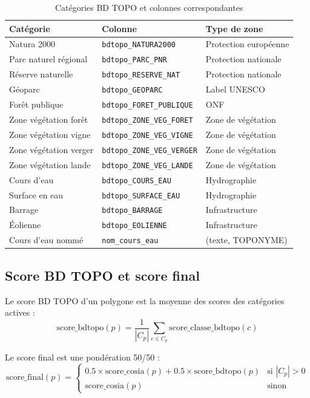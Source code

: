 \documentclass[11pt,a4paper]{report}
\newcommand{\code}[1]{\texttt{\small #1}}
\begin{document}
\begin{table}[H]
\centering
\begin{tabular}{lll}
\toprule
\rowcolor{seuilgris!75}
\textbf{Catégorie} & \textbf{Colonne} & \textbf{Type de zone} \\
\midrule
Natura 2000 & \code{bdtopo\_NATURA2000} & Protection européenne \\
Parc naturel régional & \code{bdtopo\_PARC\_PNR} & Protection nationale \\
Réserve naturelle & \code{bdtopo\_RESERVE\_NAT} & Protection nationale \\
Géoparc & \code{bdtopo\_GEOPARC} & Label UNESCO \\
Forêt publique & \code{bdtopo\_FORET\_PUBLIQUE} & ONF \\
Zone végétation forêt & \code{bdtopo\_ZONE\_VEG\_FORET} & Zone de végétation \\
Zone végétation vigne & \code{bdtopo\_ZONE\_VEG\_VIGNE} & Zone de végétation \\
Zone végétation verger & \code{bdtopo\_ZONE\_VEG\_VERGER} & Zone de végétation \\
Zone végétation lande & \code{bdtopo\_ZONE\_VEG\_LANDE} & Zone de végétation \\
Cours d'eau & \code{bdtopo\_COURS\_EAU} & Hydrographie \\
Surface en eau & \code{bdtopo\_SURFACE\_EAU} & Hydrographie \\
Barrage & \code{bdtopo\_BARRAGE} & Infrastructure \\
Éolienne & \code{bdtopo\_EOLIENNE} & Infrastructure \\
Cours d'eau nommé & \code{nom\_cours\_eau} & (texte, TOPONYME) \\
\bottomrule
\end{tabular}
\caption{Catégories BD TOPO et colonnes correspondantes}
\end{table}

\subsection{Score BD TOPO et score final}

Le score BD TOPO d'un polygone est la moyenne des scores des catégories actives :
$$
\text{score\_bdtopo}(p) = \frac{1}{|C_p|} \sum_{c \in C_p} \text{score\_classe\_bdtopo}(c)
$$

Le score final est une pondération 50/50 :
$$
\text{score\_final}(p) = \begin{cases}
  0.5 \times \text{score\_cosia}(p) + 0.5 \times \text{score\_bdtopo}(p) & \text{si } |C_p| > 0 \\
  \text{score\_cosia}(p) & \text{sinon}
\end{cases}
$$
\end{document}
